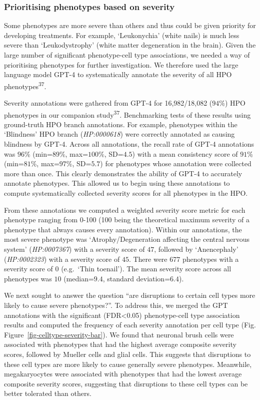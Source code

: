 \documentclass[
]{article}
\begin{document}
\subsubsection{Prioritising phenotypes based on
severity}\label{prioritising-phenotypes-based-on-severity}

Some phenotypes are more severe than others and thus could be given
priority for developing treatments. For example, `Leukonychia' (white
nails) is much less severe than `Leukodystrophy' (white matter
degeneration in the brain). Given the large number of significant
phenotype-cell type associations, we needed a way of prioritising
phenotypes for further investigation. We therefore used the large
language model GPT-4 to systematically annotate the severity of all HPO
phenotypes\textsuperscript{37}.

Severity annotations were gathered from GPT-4 for 16,982/18,082
(\(94\)\%) HPO phenotypes in our companion study\textsuperscript{37}.
Benchmarking tests of these results using ground-truth HPO branch
annotations. For example, phenotypes within the `Blindness' HPO branch
(\emph{HP:0000618}) were correctly annotated as causing blindness by
GPT-4. Across all annotations, the recall rate of GPT-4 annotations was
\(96\)\% (min=\(89\)\%, max=\(100\)\%, SD=\(4.5\)) with a mean
consistency score of \(91\)\% (min=\(81\)\%, max=\(97\)\%, SD=\(5.7\))
for phenotypes whose annotation were collected more than once. This
clearly demonstrates the ability of GPT-4 to accurately annotate
phenotypes. This allowed us to begin using these annotations to compute
systematically collected severity scores for all phenotypes in the HPO.

From these annotations we computed a weighted severity score metric for
each phenotype ranging from 0-100 (100 being the theoretical maximum
severity of a phenotype that always causes every annotation). Within our
annotations, the most severe phenotype was `Atrophy/Degeneration
affecting the central nervous system' (\emph{HP:0007367}) with a
severity score of \(47\), followed by `Anencephaly' (\emph{HP:0002323})
with a severity score of \(45\). There were 677 phenotypes with a
severity score of 0 (e.g.~`Thin toenail'). The mean severity score
across all phenotypes was \(10\) (median=\(9.4\), standard
deviation=\(6.4\)).

We next sought to answer the question ``are disruptions to certain cell
types more likely to cause severe phenotypes?''. To address this, we
merged the GPT annotations with the significant (FDR\textless0.05)
phenotype-cell type association results and computed the frequency of
each severity annotation per cell type (Fig.
Figure~\ref{fig-celltype-severity-bar}). We found that neuronal brush
cells were associated with phenotypes that had the highest average
composite severity scores, followed by Mueller cells and glial cells.
This suggests that disruptions to these cell types are more likely to
cause generally severe phenotypes. Meanwhile, megakaryocytes were
associated with phenotypes that had the lowest average composite
severity scores, suggesting that disruptions to these cell types can be
better tolerated than others.
\end{document}

